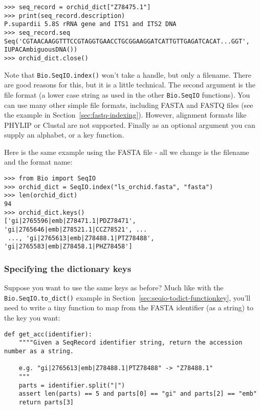 \begin{verbatim}
>>> seq_record = orchid_dict["Z78475.1"]
>>> print(seq_record.description)
P.supardii 5.8S rRNA gene and ITS1 and ITS2 DNA
>>> seq_record.seq
Seq('CGTAACAAGGTTTCCGTAGGTGAACCTGCGGAAGGATCATTGTTGAGATCACAT...GGT', IUPACAmbiguousDNA())
>>> orchid_dict.close()
\end{verbatim}

\noindent Note that \verb|Bio.SeqIO.index()| won't take a handle,
but only a filename. There are good reasons for this, but it is a little
technical. The second argument is the file format (a lower case string as
used in the other \verb|Bio.SeqIO| functions). You can use many other
simple file formats, including FASTA and FASTQ files (see the example in
Section~\ref{sec:fastq-indexing}). However, alignment
formats like PHYLIP or Clustal are not supported. Finally as an optional
argument you can supply an alphabet, or a key function.

Here is the same example using the FASTA file - all we change is the
filename and the format name:

\begin{verbatim}
>>> from Bio import SeqIO
>>> orchid_dict = SeqIO.index("ls_orchid.fasta", "fasta")
>>> len(orchid_dict)
94
>>> orchid_dict.keys()
['gi|2765596|emb|Z78471.1|PDZ78471', 'gi|2765646|emb|Z78521.1|CCZ78521', ...
 ..., 'gi|2765613|emb|Z78488.1|PTZ78488', 'gi|2765583|emb|Z78458.1|PHZ78458']
\end{verbatim}

\subsubsection{Specifying the dictionary keys}
\label{sec:seqio-index-functionkey}

Suppose you want to use the same keys as before? Much like with the
\verb|Bio.SeqIO.to_dict()| example in Section~\ref{sec:seqio-todict-functionkey},
you'll need to write a tiny function to map from the FASTA identifier
(as a string) to the key you want:

\begin{verbatim}
def get_acc(identifier):
    """"Given a SeqRecord identifier string, return the accession number as a string.

    e.g. "gi|2765613|emb|Z78488.1|PTZ78488" -> "Z78488.1"
    """
    parts = identifier.split("|")
    assert len(parts) == 5 and parts[0] == "gi" and parts[2] == "emb"
    return parts[3]
\end{verbatim}

